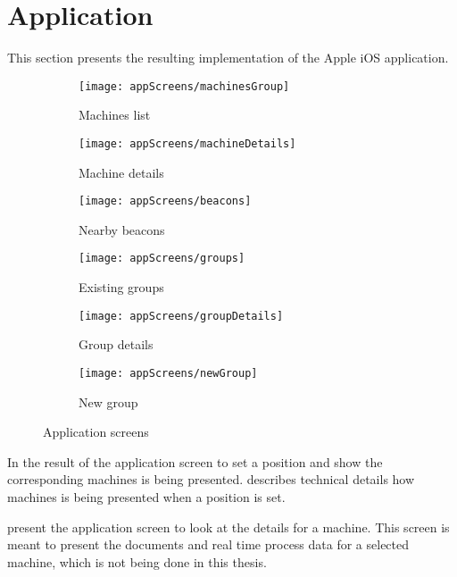 \section{Application}\label{sec:resultApp}
This section presents the resulting implementation of the Apple iOS application.

\begin{figure}[H]
	\centering
	\begin{subfigure}[t]{0.3\textwidth}
		\centering	
		\texttt{[image: appScreens/machinesGroup]}
		\caption{Machines list}
		\label{subfig:machinesList}
	\end{subfigure}%
	\begin{subfigure}[t]{0.3\textwidth}
		\centering	
		\texttt{[image: appScreens/machineDetails]}
		\caption{Machine details}
		\label{subfig:machineDetails}
	\end{subfigure}
	\begin{subfigure}[t]{0.3\textwidth}
		\centering	
		\texttt{[image: appScreens/beacons]}
		\caption{Nearby beacons}
		\label{subfig:nearbyBeacons}
	\end{subfigure}
	\begin{subfigure}[t]{0.3\textwidth}
		\centering	
		\texttt{[image: appScreens/groups]}
		\caption{Existing groups}
		\label{subfig:existingGroups}
	\end{subfigure}
	\begin{subfigure}[t]{0.3\textwidth}
		\centering	
		\texttt{[image: appScreens/groupDetails]}
		\caption{Group details}
		\label{subfig:groupDetails}
	\end{subfigure}
	\begin{subfigure}[t]{0.3\textwidth}
		\centering	
		\texttt{[image: appScreens/newGroup]}
		\caption{New group}
		\label{subfig:newGroup}
	\end{subfigure}

	\caption{Application screens}
	\label{fig:appScreens}

\end{figure}

In  the result of the application screen to set a position and show the corresponding machines is being presented.
 describes technical details how machines is being presented when a position is set.

\bigskip

 present the application screen to look at the details for a machine.
This screen is meant to present the documents and real time process data for a selected machine, which is not being done in this thesis. 

